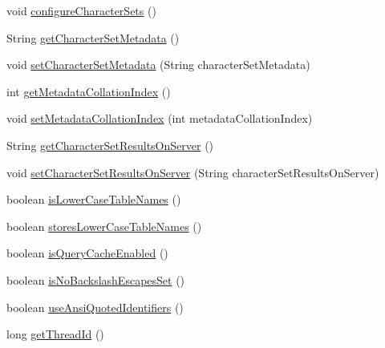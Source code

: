 \begin{DoxyCompactItemize}
\item 
void \mbox{\hyperlink{interfacecom_1_1mysql_1_1cj_1_1protocol_1_1_server_session_abcad1a4dec7e1822b0d4c52fdb0feb7d}{configure\+Character\+Sets}} ()
\item 
String \mbox{\hyperlink{interfacecom_1_1mysql_1_1cj_1_1protocol_1_1_server_session_a3aeeeb80107544ed93be2c73124bf53f}{get\+Character\+Set\+Metadata}} ()
\item 
void \mbox{\hyperlink{interfacecom_1_1mysql_1_1cj_1_1protocol_1_1_server_session_a494d0e19dd3695aa635d2696d19f0368}{set\+Character\+Set\+Metadata}} (String character\+Set\+Metadata)
\item 
int \mbox{\hyperlink{interfacecom_1_1mysql_1_1cj_1_1protocol_1_1_server_session_af72447373f7ae77b56c5563c2922e9db}{get\+Metadata\+Collation\+Index}} ()
\item 
void \mbox{\hyperlink{interfacecom_1_1mysql_1_1cj_1_1protocol_1_1_server_session_a9472dd2bebc57f2dc9f94bae07ac6e9e}{set\+Metadata\+Collation\+Index}} (int metadata\+Collation\+Index)
\item 
String \mbox{\hyperlink{interfacecom_1_1mysql_1_1cj_1_1protocol_1_1_server_session_a8c4da1a076a82273ca497c1914faf960}{get\+Character\+Set\+Results\+On\+Server}} ()
\item 
void \mbox{\hyperlink{interfacecom_1_1mysql_1_1cj_1_1protocol_1_1_server_session_a30cdcfb3f1137a3b74963b0ccdfd1014}{set\+Character\+Set\+Results\+On\+Server}} (String character\+Set\+Results\+On\+Server)
\item 
boolean \mbox{\hyperlink{interfacecom_1_1mysql_1_1cj_1_1protocol_1_1_server_session_a48d31222ed61fa5971aae698a5ff9fdf}{is\+Lower\+Case\+Table\+Names}} ()
\item 
boolean \mbox{\hyperlink{interfacecom_1_1mysql_1_1cj_1_1protocol_1_1_server_session_af13bb03c427785628050cb4466f6de24}{stores\+Lower\+Case\+Table\+Names}} ()
\item 
boolean \mbox{\hyperlink{interfacecom_1_1mysql_1_1cj_1_1protocol_1_1_server_session_ae4eabba31c09190939a9e1886466c72d}{is\+Query\+Cache\+Enabled}} ()
\item 
boolean \mbox{\hyperlink{interfacecom_1_1mysql_1_1cj_1_1protocol_1_1_server_session_a0ce8df759d76a4478164af19d85b837b}{is\+No\+Backslash\+Escapes\+Set}} ()
\item 
boolean \mbox{\hyperlink{interfacecom_1_1mysql_1_1cj_1_1protocol_1_1_server_session_a55ca4e6fce372e587c0bbc46089fa262}{use\+Ansi\+Quoted\+Identifiers}} ()
\item 
long \mbox{\hyperlink{interfacecom_1_1mysql_1_1cj_1_1protocol_1_1_server_session_aa0ebcb06b9b56f63662cedf8720a5505}{get\+Thread\+Id}} ()

\end{DoxyCompactItemize}
